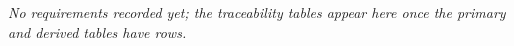 \noindent\emph{No requirements recorded yet; the traceability tables appear here once the primary and derived tables have rows.}
